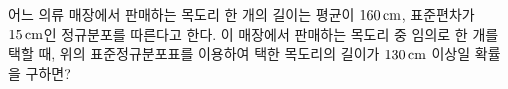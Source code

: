 \noindent\begin{minipage}[t]{0.58\linewidth}\vspace{0pt}\raggedright 어느 의류 매장에서 판매하는 목도리 한 개의 길이는 평균이 $160\mkern3mu \mathrm{cm}$, 표준편차가 $15\mkern3mu \mathrm{cm}$인 정규분포를 따른다고 한다. 이 매장에서 판매하는 목도리 중 임의로 한 개를 택할 때, 위의 표준정규분포표를 이용하여 택한 목도리의 길이가 $130\mkern3mu \mathrm{cm}$ 이상일 확률을 구하면?\end{minipage}\hfill\begin{minipage}[t]{0.4\linewidth}\vspace{0pt}\centering \resizebox{\ifdim\width>\linewidth\linewidth\else\width\fi}{!}{}\end{minipage}\par
{}
